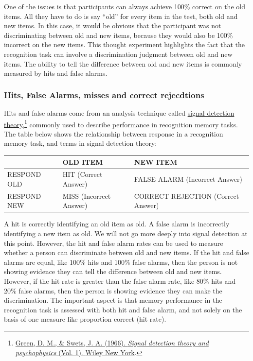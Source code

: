 \documentclass[
  oneside,
  12pt]{crumpbook}
\begin{document}
One of the issues is that participants can always achieve 100\% correct on the old items. All they have to do is say ``old'' for every item in the test, both old and new items. In this case, it would be obvious that the participant was not discriminating between old and new items, because they would also be 100\% incorrect on the new items. This thought experiment highlights the fact that the recognition task can involve a discrimination judgment between old and new items. The ability to tell the difference between old and new items is commonly measured by hits and false alarms.

\hypertarget{hits-false-alarms-misses-and-correct-rejecdtions}{%
\subsubsection{Hits, False Alarms, misses and correct rejecdtions}\label{hits-false-alarms-misses-and-correct-rejecdtions}}

Hits and false alarms come from an analysis technique called \href{https://en.wikipedia.org/wiki/Detection_theory}{signal detection theory},\footnote{\protect\hyperlink{ref-greenSignalDetectionTheory1966}{Green, D. M., \& Swets, J. A. (1966). \emph{Signal detection theory and psychophysics} (Vol. 1). {Wiley New York}}.} commonly used to describe performance in recognition memory tasks. The table below shows the relationship between response in a recognition memory task, and terms in signal detection theory:

\begin{longtable}[]{@{}lll@{}}
\toprule
& OLD ITEM & NEW ITEM \\
\midrule
\endhead
RESPOND OLD & HIT (Correct Answer) & FALSE ALARM (Incorrect Answer) \\
RESPOND NEW & MISS (Incorrect Answer) & CORRECT REJECTION (Correct Answer) \\
\bottomrule
\end{longtable}

A hit is correctly identifying an old item as old. A false alarm is incorrectly identifying a new item as old. We will not go more deeply into signal detection at this point. However, the hit and false alarm rates can be used to measure whether a person can discriminate between old and new items. If the hit and false alarms are equal, like 100\% hits and 100\% false alarms, then the person is not showing evidence they can tell the difference between old and new items. However, if the hit rate is greater than the false alarm rate, like 80\% hits and 20\% false alarms, then the person is showing evidence they can make the discrimination. The important aspect is that memory performance in the recognition task is assessed with both hit and false alarm, and not solely on the basis of one measure like proportion correct (hit rate).
\end{document}

